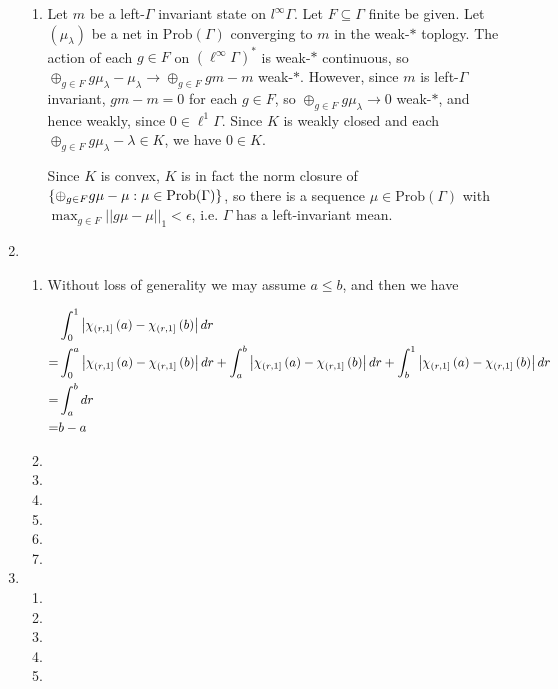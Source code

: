\documentclass[a4paper,10pt]{report}
\newcommand{\pn}[2]{||#1||_{#2}}
\DeclarePairedDelimiter{\set}{\{}{\}}
\begin{document}
\begin{enumerate}
\begin{enumerate}
			\item Let $m$ be a left-$\Gamma$ invariant state on $l^\infty\Gamma$. Let $F\subseteq\Gamma$ finite be given. Let $(\mu_\lambda)$ be a net in $\text{Prob}(\Gamma)$ converging to $m$ in the weak-$*$ toplogy. The action of each $g\in F$ on $(\ell^\infty\Gamma)^*$ is weak-$*$ continuous, so $\oplus_{g\in F}g\mu_\lambda-\mu_\lambda\to\oplus_{g\in F}gm-m$ weak-$*$. However, since $m$ is left-$\Gamma$ invariant, $gm-m=0$ for each $g\in F$, so $\oplus_{g\in F}g\mu_\lambda\to 0$ weak-$*$, and hence weakly, since $0\in\ell^1\Gamma$. Since $K$ is weakly closed and each $\oplus_{g\in F}g\mu_\lambda-\lambda\in K$, we have $0\in K$. 
				
				Since $K$ is convex, $K$ is in fact the norm closure of $\set{\oplus_{g\in F}g\mu-\mu:\mu\in\text{Prob}(\Gamma)}$, so there is a sequence $\mu\in\text{Prob}(\Gamma)$ with $\max_{g\in F}\pn{g\mu-\mu}{1}<\epsilon$, i.e. $\Gamma$ has a left-invariant mean. 
		\end{enumerate}
	\item
		\begin{enumerate}
		\item Without loss of generality we may assume $a \leq b$, and then we have

                  \begin{align*}
                    &\int_0^1 \left| \chi_{\left( r , 1 \right]} \left( a \right) - \chi_{\left( r , 1 \right]} \left( b \right) \right| dr\\
                    =& \int_0^a \left| \chi_{\left( r , 1 \right]} \left( a \right) - \chi_{\left( r , 1 \right]} \left( b \right) \right| dr + \int_a^b \left| \chi_{\left( r , 1 \right]} \left( a \right) - \chi_{\left( r , 1 \right]} \left( b \right) \right| dr + \int_b^1 \left| \chi_{\left( r , 1 \right]} \left( a \right) - \chi_{\left( r , 1 \right]} \left( b \right) \right| dr\\
                    =& \int_a^b dr\\
                    =& b - a
                  \end{align*}
			\item 
			\item 
			\item 
			\item 
			\item 
			\item 
		\end{enumerate}
	\item
		\begin{enumerate}
			\item 
			\item 
			\item 
			\item 
			\item 
		\end{enumerate}
\end{enumerate}
\end{document}
